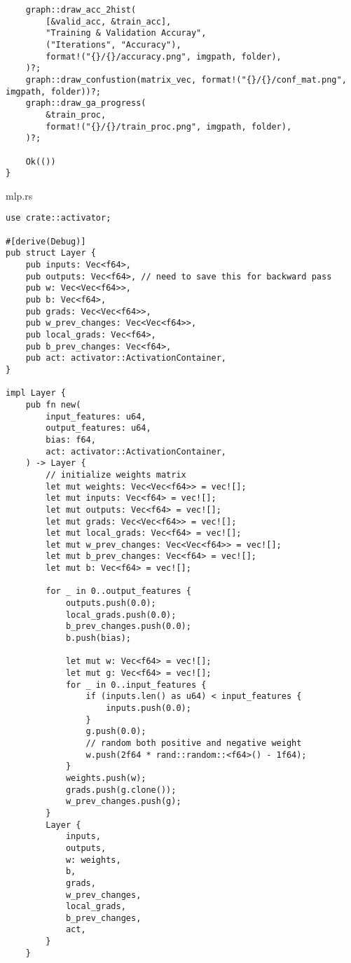 \begin{code}
\begin{verbatim}
    graph::draw_acc_2hist(
        [&valid_acc, &train_acc],
        "Training & Validation Accuray",
        ("Iterations", "Accuracy"),
        format!("{}/{}/accuracy.png", imgpath, folder),
    )?;
    graph::draw_confustion(matrix_vec, format!("{}/{}/conf_mat.png", imgpath, folder))?;
    graph::draw_ga_progress(
        &train_proc,
        format!("{}/{}/train_proc.png", imgpath, folder),
    )?;

    Ok(())
}
\end{verbatim}
\end{code}

\begin{code}
\caption{mlp.rs}
\begin{verbatim}  
use crate::activator;

#[derive(Debug)]
pub struct Layer {
    pub inputs: Vec<f64>,
    pub outputs: Vec<f64>, // need to save this for backward pass
    pub w: Vec<Vec<f64>>,
    pub b: Vec<f64>,
    pub grads: Vec<Vec<f64>>,
    pub w_prev_changes: Vec<Vec<f64>>,
    pub local_grads: Vec<f64>,
    pub b_prev_changes: Vec<f64>,
    pub act: activator::ActivationContainer,
}

impl Layer {
    pub fn new(
        input_features: u64,
        output_features: u64,
        bias: f64,
        act: activator::ActivationContainer,
    ) -> Layer {
        // initialize weights matrix
        let mut weights: Vec<Vec<f64>> = vec![];
        let mut inputs: Vec<f64> = vec![];
        let mut outputs: Vec<f64> = vec![];
        let mut grads: Vec<Vec<f64>> = vec![];
        let mut local_grads: Vec<f64> = vec![];
        let mut w_prev_changes: Vec<Vec<f64>> = vec![];
        let mut b_prev_changes: Vec<f64> = vec![];
        let mut b: Vec<f64> = vec![];

        for _ in 0..output_features {
            outputs.push(0.0);
            local_grads.push(0.0);
            b_prev_changes.push(0.0);
            b.push(bias);

            let mut w: Vec<f64> = vec![];
            let mut g: Vec<f64> = vec![];
            for _ in 0..input_features {
                if (inputs.len() as u64) < input_features {
                    inputs.push(0.0);
                }
                g.push(0.0);
                // random both positive and negative weight
                w.push(2f64 * rand::random::<f64>() - 1f64);
            }
            weights.push(w);
            grads.push(g.clone());
            w_prev_changes.push(g);
        }
        Layer {
            inputs,
            outputs,
            w: weights,
            b,
            grads,
            w_prev_changes,
            local_grads,
            b_prev_changes,
            act,
        }
    }


\end{verbatim}
\end{code}
